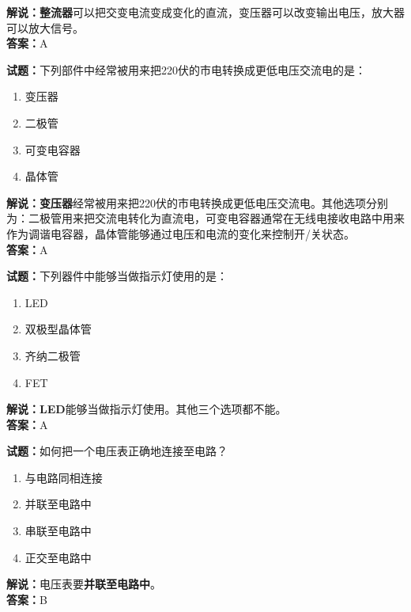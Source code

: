 \documentclass{ctexbook}
\begin{document}
\noindent\textbf{解说：整流器}可以把交变电流变成变化的直流，变压器可以改变输出电压，放大器可以放大信号。\\\noindent\textbf{答案：}A


\bigskip


\noindent\textbf{试题：}下列部件中经常被用来把220伏的市电转换成更低电压交流电的是：

\begin{enumerate}[leftmargin=3em]
	\item 变压器
	\item 二极管
	\item 可变电容器
	\item 晶体管
\end{enumerate}

\noindent\textbf{解说：变压器}经常被用来把220伏的市电转换成更低电压交流电。其他选项分别为：二极管用来把交流电转化为直流电，可变电容器通常在无线电接收电路中用来作为调谐电容器，晶体管能够通过电压和电流的变化来控制开/关状态。\\\noindent\textbf{答案：}A

\bigskip


\noindent\textbf{试题：}下列器件中能够当做指示灯使用的是：

\begin{enumerate}[leftmargin=3em]
	\item LED
	\item 双极型晶体管
	\item 齐纳二极管
	\item FET
\end{enumerate}

\noindent\textbf{解说：LED}能够当做指示灯使用。其他三个选项都不能。\\\noindent\textbf{答案：}A

\bigskip


\noindent\textbf{试题：}如何把一个电压表正确地连接至电路？

\begin{enumerate}[leftmargin=3em]
	\item 与电路同相连接
	\item 并联至电路中
	\item 串联至电路中
	\item 正交至电路中
\end{enumerate}

\noindent\textbf{解说：}电压表要\textbf{并联至电路中}。\\\noindent\textbf{答案：}B

\bigskip
\end{document}
